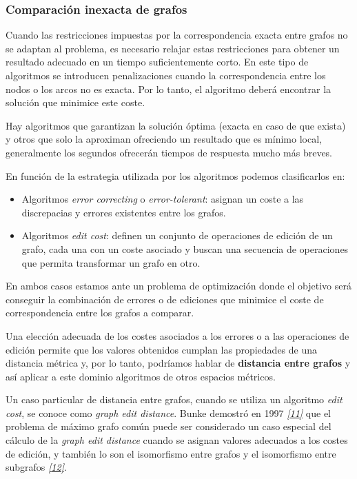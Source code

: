 \documentclass[a4paper,12pt,spanish]{book}
\begin{document}
\subsubsection{Comparación inexacta de grafos}
\label{1.state-of-the-art/ii.medidas-distancia:comparacion-inexacta-de-grafos}
Cuando las restricciones impuestas por la correspondencia exacta entre grafos
no se adaptan al problema, es necesario relajar estas restricciones para obtener un
resultado adecuado en un tiempo suficientemente corto. En este tipo de algoritmos se
introducen penalizaciones cuando la correspondencia entre los nodos o los arcos no es
exacta. Por lo tanto, el algoritmo deberá encontrar la solución que minimice este coste.

Hay algoritmos que garantizan la solución óptima (exacta en caso de que exista) y otros
que solo la aproximan ofreciendo un resultado que es mínimo local, generalmente los
segundos ofrecerán tiempos de respuesta mucho más breves.

En función de la estrategia utilizada por los algoritmos podemos clasificarlos en:
\begin{itemize}
\item {} 
Algoritmos \emph{error correcting} o \emph{error-tolerant}: asignan un coste a las
discrepacias y errores existentes entre los grafos.

\item {} 
Algoritmos \emph{edit cost}: definen un conjunto de operaciones de edición de un grafo,
cada una con un coste asociado y buscan una secuencia de operaciones que permita
transformar un grafo en otro.

\end{itemize}

En ambos casos estamos ante un problema de optimización donde el objetivo será conseguir
la combinación de errores o de ediciones que minimice el coste de correspondencia entre
los grafos a comparar.

Una elección adecuada de los costes asociados a los errores o a las operaciones de edición
permite que los valores obtenidos cumplan las propiedades de una distancia métrica y, por
lo tanto, podríamos hablar de \textbf{distancia entre grafos} y así aplicar a este dominio
algoritmos de otros espacios métricos.

Un caso particular de distancia entre grafos, cuando se utiliza un algoritmo \emph{edit cost},
se conoce como \emph{graph edit distance}. Bunke demostró en 1997 \label{1.state-of-the-art/ii.medidas-distancia:id17}{\hyperref[zreferences:bunke1997]{\emph{{[}11{]}}}} que el problema
de máximo grafo común puede ser considerado un caso especial del cálculo de la \emph{graph
edit distance} cuando se asignan valores adecuados a los costes de edición, y también lo son
el isomorfismo entre grafos y el isomorfismo entre subgrafos \label{1.state-of-the-art/ii.medidas-distancia:id18}{\hyperref[zreferences:bunke1999]{\emph{{[}12{]}}}}.
\end{document}
